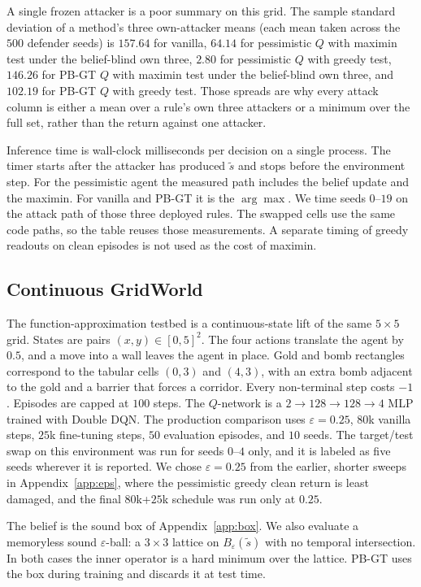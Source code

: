 \documentclass[10pt,twocolumn]{article}
\begin{document}
A single frozen attacker is a poor summary on this grid.
The sample standard deviation of a method's three own-attacker means (each mean taken across the $500$ defender seeds) is $157.64$ for vanilla, $64.14$ for pessimistic $Q$ with maximin test under the belief-blind own three, $2.80$ for pessimistic $Q$ with greedy test, $146.26$ for PB-GT $Q$ with maximin test under the belief-blind own three, and $102.19$ for PB-GT $Q$ with greedy test.
Those spreads are why every attack column is either a mean over a rule's own three attackers or a minimum over the full set, rather than the return against one attacker.

Inference time is wall-clock milliseconds per decision on a single process.
The timer starts after the attacker has produced $\tilde s$ and stops before the environment step.
For the pessimistic agent the measured path includes the belief update and the maximin.
For vanilla and PB-GT it is the $\arg\max$.
We time seeds $0$--$19$ on the attack path of those three deployed rules.
The swapped cells use the same code paths, so the table reuses those measurements.
A separate timing of greedy readouts on clean episodes is not used as the cost of maximin.

\subsection{Continuous GridWorld}
\label{sec:cgw-setup}

The function-approximation testbed is a continuous-state lift of the same $5{\times}5$ grid.
States are pairs $(x,y)\in[0,5]^2$.
The four actions translate the agent by $0.5$, and a move into a wall leaves the agent in place.
Gold and bomb rectangles correspond to the tabular cells $(0,3)$ and $(4,3)$, with an extra bomb adjacent to the gold and a barrier that forces a corridor.
Every non-terminal step costs $-1$.
Episodes are capped at $100$ steps.
The $Q$-network is a $2{\to}128{\to}128{\to}4$ MLP trained with Double DQN.
The production comparison uses $\varepsilon{=}0.25$, $80$k vanilla steps, $25$k fine-tuning steps, $50$ evaluation episodes, and $10$ seeds.
The target/test swap on this environment was run for seeds $0$--$4$ only, and it is labeled as five seeds wherever it is reported.
We chose $\varepsilon{=}0.25$ from the earlier, shorter sweeps in Appendix~\ref{app:eps}, where the pessimistic greedy clean return is least damaged, and the final $80$k+$25$k schedule was run only at $0.25$.

The belief is the sound box of Appendix~\ref{app:box}.
We also evaluate a memoryless sound $\varepsilon$-ball: a $3{\times}3$ lattice on $B_\varepsilon(\tilde s)$ with no temporal intersection.
In both cases the inner operator is a hard minimum over the lattice.
PB-GT uses the box during training and discards it at test time.
\end{document}
